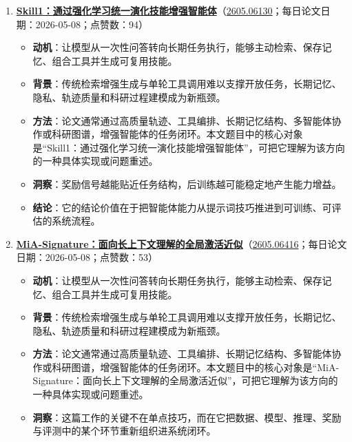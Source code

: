 \begin{enumerate}[leftmargin=1.5em]
\begin{itemize}[leftmargin=1.5em]
    \item \textbf{洞察}：真正有用的世界模型必须同时回答状态会如何变化、动作是否可行以及失败风险在哪里。
    \item \textbf{结论}：它的结论价值在于把智能体能力从提示词技巧推进到可训练、可评估的系统流程。
  \end{itemize}
  \item \textbf{\href{https://huggingface.co/papers/2605.06130}{Skill1：通过强化学习统一演化技能增强智能体}}（\href{https://arxiv.org/abs/2605.06130}{2605.06130}；每日论文日期：2026-05-08；点赞数：94）
  \begin{itemize}[leftmargin=1.5em]
    \item \textbf{动机}：让模型从一次性问答转向长期任务执行，能够主动检索、保存记忆、组合工具并生成可复用技能。
    \item \textbf{背景}：传统检索增强生成与单轮工具调用难以支撑开放任务，长期记忆、隐私、轨迹质量和科研过程建模成为新瓶颈。
    \item \textbf{方法}：论文通常通过高质量轨迹、工具编排、长期记忆结构、多智能体协作或科研图谱，增强智能体的任务闭环。本文题目中的核心对象是“Skill1：通过强化学习统一演化技能增强智能体”，可把它理解为该方向的一种具体实现或问题重述。
    \item \textbf{洞察}：奖励信号越能贴近任务结构，后训练越可能稳定地产生能力增益。
    \item \textbf{结论}：它的结论价值在于把智能体能力从提示词技巧推进到可训练、可评估的系统流程。
  \end{itemize}
  \item \textbf{\href{https://huggingface.co/papers/2605.06416}{MiA-Signature：面向长上下文理解的全局激活近似}}（\href{https://arxiv.org/abs/2605.06416}{2605.06416}；每日论文日期：2026-05-08；点赞数：53）
  \begin{itemize}[leftmargin=1.5em]
    \item \textbf{动机}：让模型从一次性问答转向长期任务执行，能够主动检索、保存记忆、组合工具并生成可复用技能。
    \item \textbf{背景}：传统检索增强生成与单轮工具调用难以支撑开放任务，长期记忆、隐私、轨迹质量和科研过程建模成为新瓶颈。
    \item \textbf{方法}：论文通常通过高质量轨迹、工具编排、长期记忆结构、多智能体协作或科研图谱，增强智能体的任务闭环。本文题目中的核心对象是“MiA-Signature：面向长上下文理解的全局激活近似”，可把它理解为该方向的一种具体实现或问题重述。
    \item \textbf{洞察}：这篇工作的关键不在单点技巧，而在它把数据、模型、推理、奖励与评测中的某个环节重新组织进系统闭环。

\end{itemize}
\end{enumerate}

